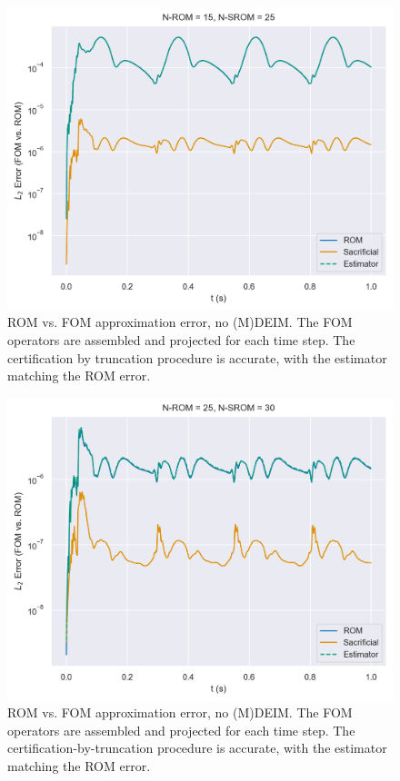 \documentclass[../../thesis.tex]{subfiles}
\begin{document}
\clearpage
\begin{figure}[h]
    \includegraphics[width =\columnwidth]{research_project/piston/figures/nonlinear_displacement/truncation_error/no_deim/error_estimation_rom_15_srom_25_0.png}
    \caption{ROM vs. FOM approximation error, no (M)DEIM.
    The FOM operators are assembled and projected for each time step.
    The certification by truncation procedure is accurate, with the estimator matching the ROM error.}
    \label{fig:nlinear_disp_no_deim_errors_above_threshold}
\end{figure}

\begin{figure}[h]
    \includegraphics[width =\columnwidth]{research_project/piston/figures/nonlinear_displacement/truncation_error/no_deim/error_estimation_rom_25_srom_30_0.png}
    \caption{ROM vs. FOM approximation error, no (M)DEIM.
    The FOM operators are assembled and projected for each time step.
    The certification-by-truncation procedure is accurate, with the estimator matching the ROM error.}
    \label{fig:nlinear_disp_no_deim_errors_below_threshold}
\end{figure}
\end{document}
